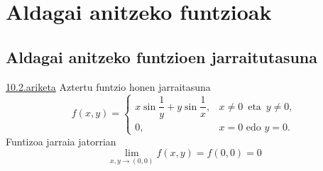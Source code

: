 \chapter{Aldagai anitzeko funtzioak}
\section{Aldagai anitzeko funtzioen jarraitutasuna}
\underline{10.2.ariketa} Aztertu funtzio honen jarraitasuna
$$f(x,y) = \left\{ \begin{array}{cl}
		x\sin \dfrac{1}{y} +y \sin \dfrac{1}{x},  &  x \neq 0 \, \mbox{ eta } \, y \neq 0, \\
                 0,	                                &  x=0 \mbox{ edo } y=0.
		   \end{array} \right. $$
Funtizoa jarraia jatorrian \Longleftrightarrow
\[
\lim_{x,y \to (0,0)}f(x,y)=f(0,0)=0
\]

